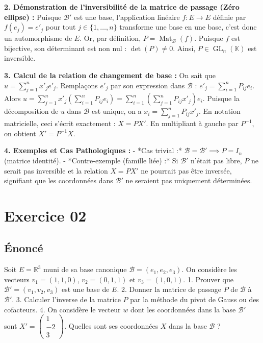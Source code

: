 \documentclass{report}
\begin{document}
\textbf{2. Démonstration de l'inversibilité de la matrice de passage (Zéro ellipse) :}
Puisque $\mathcal{B}'$ est une base, l'application linéaire $f : E \to E$ définie par $f(e_j) = e'_j$ pour tout $j \in \{1, \dots, n\}$ transforme une base en une base, c'est donc un automorphisme de $E$.
Or, par définition, $P = \operatorname{Mat}_{\mathcal{B}}(f)$.
Puisque $f$ est bijective, son déterminant est non nul : $\det(P) \neq 0$.
Ainsi, $P \in \operatorname{GL}_n(\mathbb{K})$ est inversible.

\textbf{3. Calcul de la relation de changement de base :}
On sait que $u = \sum_{j=1}^n x'_j e'_j$.
Remplaçons $e'_j$ par son expression dans $\mathcal{B}$ : $e'_j = \sum_{i=1}^n P_{ij} e_i$.
Alors $u = \sum_{j=1}^n x'_j \left( \sum_{i=1}^n P_{ij} e_i \right) = \sum_{i=1}^n \left( \sum_{j=1}^n P_{ij} x'_j \right) e_i$.
Puisque la décomposition de $u$ dans $\mathcal{B}$ est unique, on a $x_i = \sum_{j=1}^n P_{ij} x'_j$.
En notation matricielle, ceci s'écrit exactement : $X = P X'$.
En multipliant à gauche par $P^{-1}$, on obtient $X' = P^{-1} X$.

\textbf{4. Exemples et Cas Pathologiques :}
- *Cas trivial :* $\mathcal{B} = \mathcal{B}' \implies P = I_n$ (matrice identité).
- *Contre-exemple (famille liée) :* Si $\mathcal{B}'$ n'était pas libre, $P$ ne serait pas inversible et la relation $X = P X'$ ne pourrait pas être inversée, signifiant que les coordonnées dans $\mathcal{B}'$ ne seraient pas uniquement déterminées.


\section*{Exercice 02}
\subsection*{Énoncé}
Soit $E = \mathbb{R}^3$ muni de sa base canonique $\mathcal{B} = (e_1, e_2, e_3)$.
On considère les vecteurs $v_1 = (1, 1, 0)$, $v_2 = (0, 1, 1)$ et $v_3 = (1, 0, 1)$.
1. Prouver que $\mathcal{B}' = (v_1, v_2, v_3)$ est une base de $E$.
2. Donner la matrice de passage $P$ de $\mathcal{B}$ à $\mathcal{B}'$.
3. Calculer l'inverse de la matrice $P$ par la méthode du pivot de Gauss ou des cofacteurs.
4. On considère le vecteur $w$ dont les coordonnées dans la base $\mathcal{B}'$ sont $X' = \begin{pmatrix} 1 \\ -2 \\ 3 \end{pmatrix}$. Quelles sont ses coordonnées $X$ dans la base $\mathcal{B}$ ?
\end{document}
